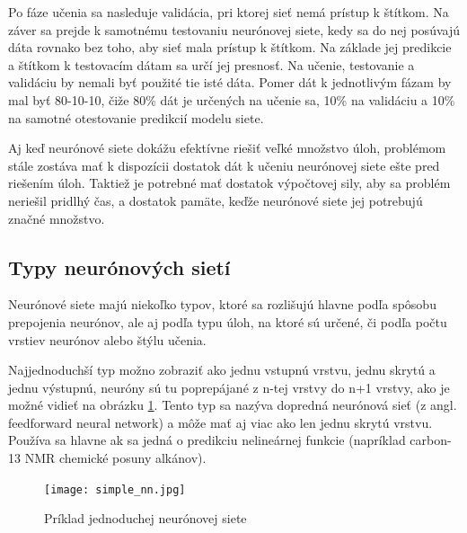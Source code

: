 Po fáze učenia sa nasleduje validácia, pri ktorej sieť nemá prístup k štítkom. Na záver sa prejde k samotnému testovaniu neurónovej siete, kedy sa do nej posúvajú dáta rovnako bez toho, aby sieť mala prístup k štítkom. Na základe jej predikcie a štítkom k testovacím dátam sa určí jej presnosť. Na učenie, testovanie a validáciu by nemali byť použité tie isté dáta. Pomer dát k jednotlivým fázam by mal byť 80-10-10\cite{80-10-10}, čiže 80\% dát je určených na učenie sa, 10\% na validáciu a 10\% na samotné otestovanie predikcií modelu siete. 

Aj keď neurónové siete dokážu efektívne riešiť veľké množstvo úloh, problémom stále zostáva mať k dispozícii dostatok dát k učeniu neurónovej siete ešte pred riešením úloh. Taktiež je potrebné mať dostatok výpočtovej sily, aby sa problém neriešil pridlhý čas, a dostatok pamäte, keďže neurónové siete jej potrebujú značné množstvo. 	
	 
	
\subsection{Typy neurónových sietí}

	Neurónové siete majú niekoľko typov, ktoré  sa rozlišujú hlavne podľa spôsobu prepojenia neurónov, ale aj podľa typu úloh, na ktoré sú určené, či podľa počtu vrstiev neurónov alebo štýlu učenia. %
	
	
	Najjednoduchší typ možno zobraziť ako jednu vstupnú vrstvu, jednu skrytú a jednu výstupnú, neuróny sú tu poprepájané z n-tej vrstvy do n+1 vrstvy, ako je možné vidieť na obrázku \ref{simple_nn}. Tento typ sa nazýva dopredná neurónová sieť (z angl. feedforward neural network) a môže mať aj viac ako len jednu skrytú vrstvu. Používa sa hlavne ak sa jedná  o predikciu nelineárnej funkcie (napríklad carbon-13 NMR chemické posuny alkánov\cite{feedforward}). 
	\begin{figure}[H]
		\begin{center}\texttt{[image: simple\_nn.jpg]}\end{center}
		\caption[Jednoduchá neurónová sieť]{Príklad jednoduchej neurónovej siete}\label{simple_nn}
	\end{figure}
	
